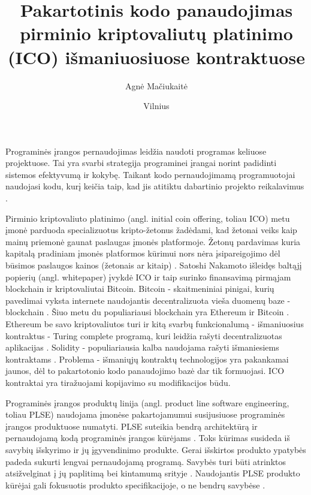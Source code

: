 \documentclass{VUMIFPSkursinis}
\title{Pakartotinis kodo panaudojimas pirminio kriptovaliutų platinimo (ICO) išmaniuosiuose kontraktuose}
\author{Agnė Mačiukaitė}
\date{Vilnius \\ \the\year}
\begin{document}
\maketitle

\tableofcontents


Programinės įrangos pernaudojimas leidžia naudoti programas keliuose projektuose. Tai yra svarbi strategija programinei įrangai norint padidinti sistemos efektyvumą ir kokybę. Taikant kodo pernaudojimamą programuotojai naudojasi kodu, kurį keičia taip, kad jis atitiktu dabartinio projekto reikalavimus \cite {Ravichandran2003}.

Pirminio kriptovaliuto platinimo (angl. initial coin offering, toliau ICO) metu įmonė parduoda specializuotus kripto-žetonus žadėdami, kad žetonai veiks kaip mainų priemonė gaunat paslaugas įmonės platformoje. Žetonų pardavimas kuria kapitalą pradiniam įmonės platformos kūrimui nors nėra įsipareigojimo dėl būsimos paslaugos kainos (žetonais ar kitaip) \cite{Catalini2018}. Satoshi Nakamoto išleidęs baltąjį popierių (angl. whitepaper) \cite{Nakamoto2008} įvykdė ICO  ir taip surinko finansavimą pirmąjam blockchain ir kriptovaliutai Bitcoin. Bitcoin - skaitmeniniai pinigai, kurių pavedimai vyksta internete naudojantis decentralizuota vieša duomenų baze - blockchain \cite{Swan2015}. Šiuo metu du populiariausi blockchain yra Ethereum ir Bitcoin \cite{Luu}. Ethereum be savo kriptovaliutos turi ir kitą svarbų funkcionalumą - išmaniuosius kontraktus - Turing complete programą, kuri leidžia rašyti decentralizuotas aplikacijas \cite{Buterin2014}. Solidity - populiariausia kalba naudojama rašyti išmaniesiems kontraktams \cite{Dannen}. Problema - išmaniųjų kontraktų technologijos yra pakankamai jaunos, dėl to pakartotonio kodo panaudojimo bazė dar tik formuojasi. ICO kontraktai yra tiražuojami kopijavimo su modifikacijos būdu.

Programinės įrangos produktų linija (angl. product line software engineering, toliau PLSE) naudojama įmonėse pakartojamumui susijusiuose programinės įrangos produktuose numatyti. PLSE suteikia bendrą architektūrą ir pernaudojamą kodą programinės įrangos kūrėjams \cite{Svahnberg}. Toks kūrimas susideda iš savybių išskyrimo ir jų įgyvendinimo produkte. Gerai išskirtos produkto ypatybės padeda sukurti lengvai pernaudojamą programą. Savybės turi būti atrinktos atsižvelginat į jų paplitimą bei kintamumą srityje \cite{Lee2015}. Naudojantis PLSE produkto kūrėjai gali fokusuotis produkto specifikacijoje, o ne bendrų savybėse \cite{Svahnberg}.
\end{document}
